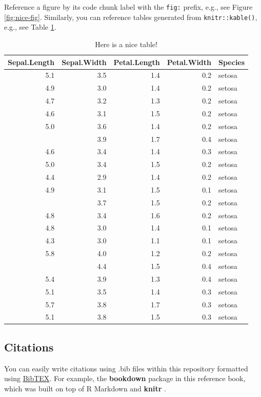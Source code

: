 \documentclass[
]{book}
\begin{document}
Reference a figure by its code chunk label with the \texttt{fig:} prefix, e.g., see Figure \ref{fig:nice-fig}. Similarly, you can reference tables generated from \texttt{knitr::kable()}, e.g., see Table \ref{tab:nice-tab}.

\begin{table}

\caption{\label{tab:nice-tab}Here is a nice table!}
\centering
\begin{tabular}[t]{rrrrl}
\toprule
Sepal.Length & Sepal.Width & Petal.Length & Petal.Width & Species\\
\midrule
5.1 & 3.5 & 1.4 & 0.2 & setosa\\
4.9 & 3.0 & 1.4 & 0.2 & setosa\\
4.7 & 3.2 & 1.3 & 0.2 & setosa\\
4.6 & 3.1 & 1.5 & 0.2 & setosa\\
5.0 & 3.6 & 1.4 & 0.2 & setosa\\
\addlinespace
5.4 & 3.9 & 1.7 & 0.4 & setosa\\
4.6 & 3.4 & 1.4 & 0.3 & setosa\\
5.0 & 3.4 & 1.5 & 0.2 & setosa\\
4.4 & 2.9 & 1.4 & 0.2 & setosa\\
4.9 & 3.1 & 1.5 & 0.1 & setosa\\
\addlinespace
5.4 & 3.7 & 1.5 & 0.2 & setosa\\
4.8 & 3.4 & 1.6 & 0.2 & setosa\\
4.8 & 3.0 & 1.4 & 0.1 & setosa\\
4.3 & 3.0 & 1.1 & 0.1 & setosa\\
5.8 & 4.0 & 1.2 & 0.2 & setosa\\
\addlinespace
5.7 & 4.4 & 1.5 & 0.4 & setosa\\
5.4 & 3.9 & 1.3 & 0.4 & setosa\\
5.1 & 3.5 & 1.4 & 0.3 & setosa\\
5.7 & 3.8 & 1.7 & 0.3 & setosa\\
5.1 & 3.8 & 1.5 & 0.3 & setosa\\
\bottomrule
\end{tabular}
\end{table}

\hypertarget{citations}{%
\subsection{Citations}\label{citations}}

You can easily write citations using .bib files within this repository formatted using \href{http://www.bibtex.org/}{BibTEX}. For example, the \textbf{bookdown} package \citep{R-bookdown} in this reference book, which was built on top of R Markdown and \textbf{knitr} \citep{xie2015}.
\end{document}

